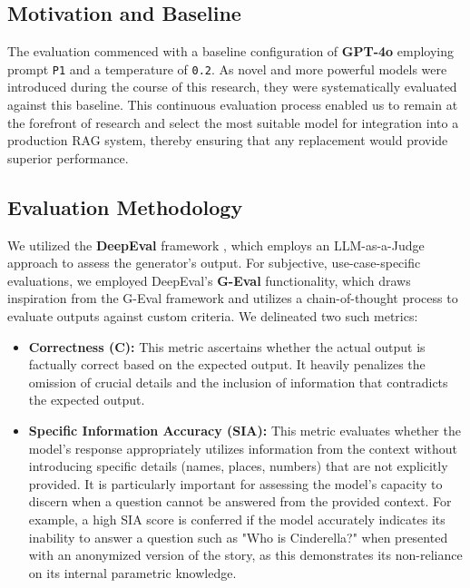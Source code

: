 \subsection{Motivation and Baseline}
The evaluation commenced with a baseline configuration of \textbf{GPT-4o} employing prompt \texttt{P1} and a temperature of \texttt{0.2}. As novel and more powerful models were introduced during the course of this research, they were systematically evaluated against this baseline. This continuous evaluation process enabled us to remain at the forefront of research and select the most suitable model for integration into a production RAG system, thereby ensuring that any replacement would provide superior performance.

\subsection{Evaluation Methodology}\label{sec:evaluation-methodology}
We utilized the \textbf{DeepEval} framework \autocite{deepeval2023}, which employs an LLM-as-a-Judge approach to assess the generator's output. For subjective, use-case-specific evaluations, we employed DeepEval's \textbf{G-Eval} functionality, which draws inspiration from the G-Eval framework \autocite{liu2023gevalnlgevaluationusing} and utilizes a chain-of-thought process to evaluate outputs against custom criteria. We delineated two such metrics:
\begin{itemize}
    \item \textbf{Correctness (C):} This metric ascertains whether the actual output is factually correct based on the expected output. It heavily penalizes the omission of crucial details and the inclusion of information that contradicts the expected output.
    \item \textbf{Specific Information Accuracy (SIA):} This metric evaluates whether the model's response appropriately utilizes information from the context without introducing specific details (names, places, numbers) that are not explicitly provided. It is particularly important for assessing the model's capacity to discern when a question cannot be answered from the provided context. For example, a high SIA score is conferred if the model accurately indicates its inability to answer a question such as "Who is Cinderella?" when presented with an anonymized version of the story, as this demonstrates its non-reliance on its internal parametric knowledge.
\end{itemize}

